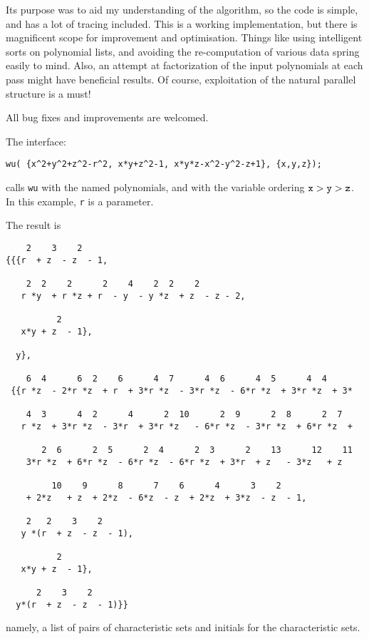 

Its purpose was to aid my understanding of the algorithm, so the code is
simple, and has a lot of tracing included. This is a working implementation,
but there is magnificent scope for improvement and optimisation. Things
like using intelligent sorts on polynomial lists, and avoiding the
re-computation of various data spring easily to mind. Also, an attempt
at factorization of the input polynomials at each pass might have beneficial
results. Of course, exploitation of the natural parallel structure is a must!

All bug fixes and improvements are welcomed.

The interface:
\begin{verbatim}
wu( {x^2+y^2+z^2-r^2, x*y+z^2-1, x*y*z-x^2-y^2-z+1}, {x,y,z});
\end{verbatim}
calls {\tt wu} with the named polynomials, and with the variable ordering
${\tt x} > {\tt y} > {\tt z}$. In this example, {\tt r} is a parameter.

The result is
\begin{verbatim}
    2    3    2
{{{r  + z  - z  - 1,

    2  2    2      2    4    2  2    2
   r *y  + r *z + r  - y  - y *z  + z  - z - 2,

          2
   x*y + z  - 1},

  y},

    6  4      6  2    6      4  7      4  6      4  5      4  4
 {{r *z  - 2*r *z  + r  + 3*r *z  - 3*r *z  - 6*r *z  + 3*r *z  + 3*

    4  3      4  2      4      2  10      2  9      2  8      2  7
   r *z  + 3*r *z  - 3*r  + 3*r *z   - 6*r *z  - 3*r *z  + 6*r *z  +

       2  6      2  5      2  4      2  3      2    13      12    11
    3*r *z  + 6*r *z  - 6*r *z  - 6*r *z  + 3*r  + z   - 3*z   + z

         10    9      8      7    6      4      3    2
    + 2*z   + z  + 2*z  - 6*z  - z  + 2*z  + 3*z  - z  - 1,

    2   2    3    2
   y *(r  + z  - z  - 1),

          2
   x*y + z  - 1},

      2    3    2
  y*(r  + z  - z  - 1)}}
\end{verbatim}
namely, a list of pairs of characteristic sets and initials for the
characteristic sets.

